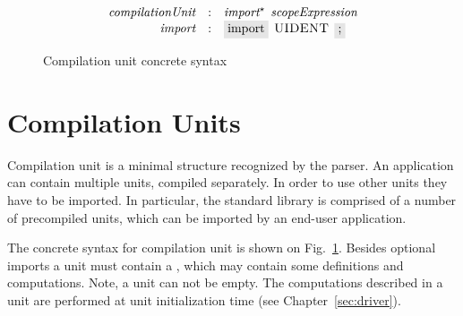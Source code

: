 \FloatBarrier

\begin{figure}[t]
  \[
    \begin{array}{rcl}
      \defterm{compilationUnit}  & : & \nonterm{import}^\star\s\nonterm{scopeExpression}\\
      \defterm{import}           & : & \term{import}\s\token{UIDENT}\s\term{;}
    \end{array}
  \]
  \caption{Compilation unit concrete syntax}
  \label{compilation_unit}
\end{figure}

\section{Compilation Units}
\label{sec:compilation_units}

Compilation unit is a minimal structure recognized by the parser. An application can contain multiple units, compiled separately.
In order to use other units they have to be imported. In particular, the standard library is comprised of a number of precompiled units,
which can be imported by an end-user application.

The concrete syntax for compilation unit is shown on Fig.~\ref{compilation_unit}. Besides optional imports a unit must contain
a , which may contain some definitions and computations. Note, a unit can not be empty. The computations described in
a unit are performed at unit initialization time (see Chapter~\ref{sec:driver}).

